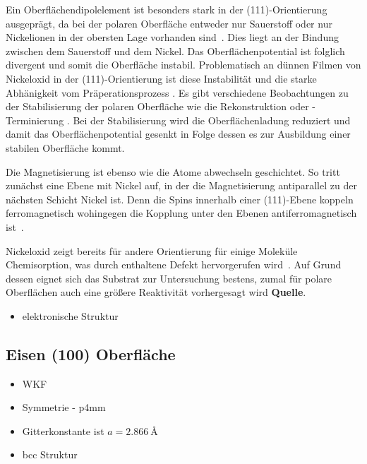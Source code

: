             Ein Oberflächendipolelement ist besonders stark in der (111)-Orientierung ausgeprägt, da bei der polaren Oberfläche entweder nur Sauerstoff oder nur Nickelionen in der obersten Lage vorhanden sind~\cite{NiO_8}.
            Dies liegt an der Bindung zwischen dem Sauerstoff und dem Nickel.
            Das Oberflächenpotential ist folglich divergent und somit die Oberfläche instabil.
            Problematisch an dünnen Filmen von Nickeloxid in der (111)-Orientierung ist diese Instabilität und die starke Abhänigkeit vom Präperationsprozess \cite{NiO_36}.
            Es gibt verschiedene Beobachtungen zu der Stabilisierung der polaren Oberfläche wie die Rekonstruktion oder -Terminierung \cite{NiO_36, NiO_35, NiO_34, NiO_27, NiO_10}.
            Bei der Stabilisierung wird die Oberflächenladung reduziert und damit das Oberflächenpotential gesenkt in Folge dessen es zur Ausbildung einer stabilen Oberfläche kommt.

            Die Magnetisierung ist ebenso wie die Atome abwechseln geschichtet.
            So tritt zunächst eine Ebene mit Nickel auf, in der die Magnetisierung antiparallel zu der nächsten Schicht Nickel ist.
            Denn die Spins innerhalb einer (111)-Ebene koppeln ferromagnetisch wohingegen die Kopplung unter den Ebenen antiferromagnetisch ist~\cite{FeO_6}.

            Nickeloxid zeigt bereits für andere Orientierung für einige Moleküle Chemisorption, was durch enthaltene Defekt hervorgerufen wird~\cite{kunz_chemisorption_1985}.
            Auf Grund dessen eignet sich das Substrat zur Untersuchung bestens, zumal für polare Oberflächen auch eine größere Reaktivität vorhergesagt wird \textbf{Quelle}.
            \begin{itemize}
                \item elektronische Struktur
            \end{itemize}
        \subsection{Eisen (100) Oberfläche}
            \begin{itemize}
                \item WKF
                \item Symmetrie - p4mm
                \item Gitterkonstante ist $a = \SI{2.866}{\angstrom}$
                \item bcc Struktur
            \end{itemize}

